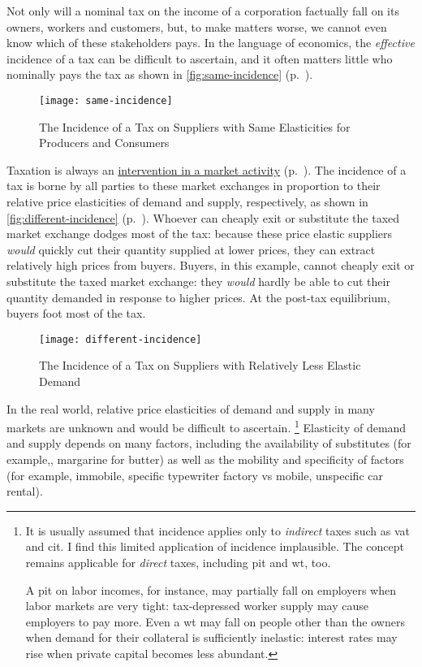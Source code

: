 Not only will a nominal tax on the income of a corporation factually fall on its owners, workers and customers, but, to make matters worse, we cannot even know which of these stakeholders pays.
In the language of economics, the \emph{effective} incidence of a tax can be difficult to ascertain, and it often matters little who nominally pays the tax as shown in \autoref{fig:same-incidence} (p.~\pageref{fig:same-incidence}).

 \begin{figure}[htbp]
	\centering
	\texttt{[image: same-incidence]}
	\caption[Incidence of a Tax on Suppliers with Unit-Elastic Supply and Demand]{The Incidence of a Tax on Suppliers with Same Elasticities for Producers and Consumers}
	\label{fig:same-incidence}
\end{figure}

Taxation is always an \hyperref[sec:market-vs-command]{intervention in a market activity} (p.~\pageref{sec:market-vs-command}).
The incidence of a tax is borne by all parties to these market exchanges in proportion to their relative price elasticities of demand and supply, respectively, as shown in \autoref{fig:different-incidence} (p.~\pageref{fig:different-incidence}).
Whoever can cheaply exit or substitute the taxed market exchange dodges most of the tax:
because these price elastic suppliers \emph{would} quickly cut their quantity supplied at lower prices, they can extract relatively high prices from buyers.
Buyers, in this example, cannot cheaply exit or substitute the taxed market exchange:
they \emph{would} hardly be able to cut their quantity demanded in response to higher prices.
At the post-tax equilibrium, buyers foot most of the tax.

\begin{figure}[htbp]
	\centering
	\texttt{[image: different-incidence]}
	\caption[Incidence of a Tax on Suppliers with Relatively Inelastic Demand]{The Incidence of a Tax on Suppliers with Relatively Less Elastic Demand}
	\label{fig:different-incidence}
\end{figure}

In the real world, relative price elasticities of demand and supply in many markets are unknown and would be difficult to ascertain.
\footnote{
	It is usually assumed that incidence applies only to \emph{indirect} taxes such as \gls{vat} and \gls{cit}.
	I find this limited application of incidence implausible.
	The concept remains applicable for \emph{direct} taxes, including \gls{pit} and \gls{wt}, too.

	A \gls{pit} on labor incomes, for instance, may partially fall on employers when labor markets are very tight:
	tax-depressed worker supply may cause employers to pay more.
	Even a \gls{wt} may fall on people other than the owners when demand for their collateral is sufficiently inelastic:
	interest rates may rise when private capital becomes less abundant.
}
Elasticity of demand and supply depends on many factors, including the availability of substitutes (for example,, margarine for butter) as well as the mobility and specificity of factors (for example, immobile, specific typewriter factory vs mobile, unspecific car rental).

